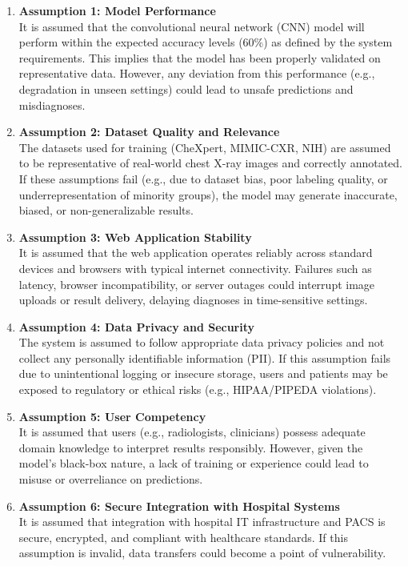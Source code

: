 \documentclass{article}
\begin{document}
\begin{enumerate}
  \item \textbf{Assumption 1: Model Performance} \\
    It is assumed that the convolutional neural network (CNN) model will perform within the expected accuracy levels ($ 60\%$)
 as defined by the system requirements. This implies that the model has been properly validated on representative data. However, any deviation from this performance (e.g., degradation in unseen settings) could lead to unsafe predictions and misdiagnoses.

  \item \textbf{Assumption 2: Dataset Quality and Relevance} \\
    The datasets used for training (CheXpert, MIMIC-CXR, NIH) are assumed to be representative of real-world chest X-ray images and correctly annotated. If these assumptions fail (e.g., due to dataset bias, poor labeling quality, or underrepresentation of minority groups), the model may generate inaccurate, biased, or non-generalizable results.

  \item \textbf{Assumption 3: Web Application Stability} \\
    It is assumed that the web application operates reliably across standard devices and browsers with typical internet connectivity. Failures such as latency, browser incompatibility, or server outages could interrupt image uploads or result delivery, delaying diagnoses in time-sensitive settings.

  \item \textbf{Assumption 4: Data Privacy and Security} \\
    The system is assumed to follow appropriate data privacy policies and not collect any personally identifiable information (PII). If this assumption fails due to unintentional logging or insecure storage, users and patients may be exposed to regulatory or ethical risks (e.g., HIPAA/PIPEDA violations).

  \item \textbf{Assumption 5: User Competency} \\
    It is assumed that users (e.g., radiologists, clinicians) possess adequate domain knowledge to interpret results responsibly. However, given the model's black-box nature, a lack of training or experience could lead to misuse or overreliance on predictions.

  \item \textbf{Assumption 6: Secure Integration with Hospital Systems} \\
    It is assumed that integration with hospital IT infrastructure and PACS is secure, encrypted, and compliant with healthcare standards. If this assumption is invalid, data transfers could become a point of vulnerability.


\end{enumerate}
\end{document}
